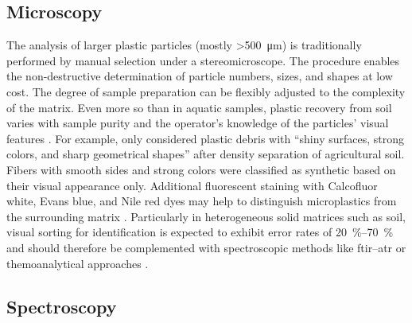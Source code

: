 \subsection{Microscopy}
\label{sec:analytical-techniques:microscopy}

The analysis of larger plastic particles (mostly \SI{>500}{\micro\meter}) is traditionally performed by manual selection under a stereomicroscope. The procedure enables the non-destructive determination of particle numbers, sizes, and shapes at low cost. The degree of sample preparation can be flexibly adjusted to the complexity of the matrix. Even more so than in aquatic samples, plastic recovery from soil varies with sample purity and the operator's knowledge of the particles' visual features \citep{LusherIt2020,FilellaQuestions2015,ZhangDistribution2020}. For example, \citet{CorradiniPredicting2019} only considered plastic debris with ``shiny surfaces, strong colors, and sharp geometrical shapes'' after density separation of agricultural soil. Fibers with smooth sides and strong colors were classified as synthetic based on their visual appearance only. Additional fluorescent staining with Calcofluor white, Evans blue, and Nile red dyes may help to distinguish microplastics from the surrounding matrix \citep{HelmbergerCounterstaining2020,NelDetection2021}. Particularly in heterogeneous solid matrices such as soil, visual sorting for identification is expected to exhibit error rates of \SIrange{20}{70}{\percent} \citep{BlasingPlastics2018} and should therefore be complemented with spectroscopic methods like \ac{ftir}--\ac{atr} or themoanalytical approaches \citep{HeMicroplastics2018}.

\subsection{Spectroscopy}
\label{sec:analytical-techniques:spectroscopy}

